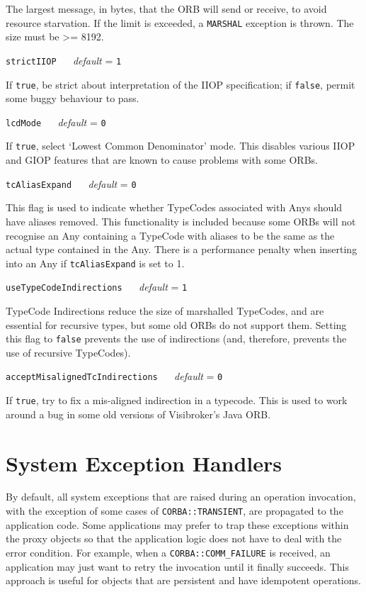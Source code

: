 \documentclass[11pt,twoside,a4paper]{book}
\makeatletter
\newcommand{\code}[1]{\texttt{#1}}
\newcommand{\confopt}[2]
  {\vspace{\baselineskip}\par\noindent\code{#1} ~~ \textit{default} =
   \code{#2}}
\renewcommand{\confopt}[2]
  {\vspace{\baselineskip}\par\noindent\code{#1} ~~ \textit{default} =
   \code{#2}\\[-1ex]\@afterheading}
\makeatother
\begin{document}
The largest message, in bytes, that the ORB will send or receive, to
avoid resource starvation. If the limit is exceeded, a \code{MARSHAL}
exception is thrown. The size must be >= 8192.

\confopt{strictIIOP}{1}

If \code{true}, be strict about interpretation of the IIOP
specification; if \code{false}, permit some buggy behaviour to pass.


\confopt{lcdMode}{0}

If \code{true}, select `Lowest Common Denominator' mode. This disables
various IIOP and GIOP features that are known to cause problems with
some ORBs.


\confopt{tcAliasExpand}{0}

This flag is used to indicate whether TypeCodes associated with Anys
should have aliases removed. This functionality is included because
some ORBs will not recognise an Any containing a TypeCode with aliases
to be the same as the actual type contained in the Any. There is a
performance penalty when inserting into an Any if \code{tcAliasExpand}
is set to 1.


\confopt{useTypeCodeIndirections}{1}

TypeCode Indirections reduce the size of marshalled TypeCodes, and are
essential for recursive types, but some old ORBs do not support them.
Setting this flag to \code{false} prevents the use of indirections
(and, therefore, prevents the use of recursive TypeCodes).


\confopt{acceptMisalignedTcIndirections}{0}

If \code{true}, try to fix a mis-aligned indirection in a
typecode. This is used to work around a bug in some old versions of
Visibroker's Java ORB.


\vspace{2\baselineskip}


\section{System Exception Handlers}

By default, all system exceptions that are raised during an operation
invocation, with the exception of some cases of
\code{CORBA::TRANSIENT}, are propagated to the application code. Some
applications may prefer to trap these exceptions within the proxy
objects so that the application logic does not have to deal with the
error condition. For example, when a \code{CORBA::COMM\_FAILURE} is
received, an application may just want to retry the invocation until
it finally succeeds. This approach is useful for objects that are
persistent and have idempotent operations.
\end{document}
